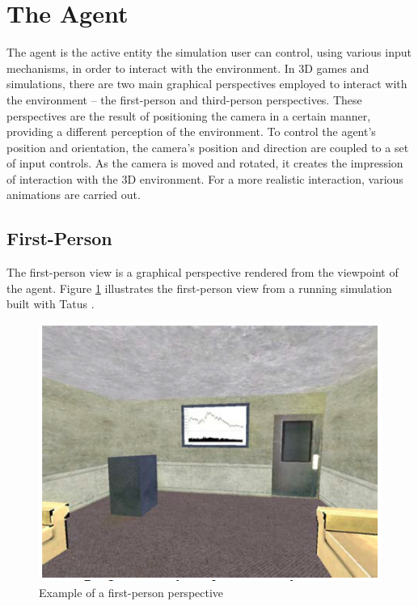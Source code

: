 \section{The Agent} %
\label{sec:the_agent}
The agent is the active entity the simulation user can control, using various input mechanisms, in order to interact with the environment. In 3D games and simulations, there are two main graphical perspectives employed to interact with the environment -- the first-person and third-person perspectives. These perspectives are the result of positioning the camera in a certain manner, providing a different perception of the environment. To control the agent's position and orientation, the camera's position and direction are coupled to a set of input controls. As the camera is moved and rotated, it creates the impression of interaction with the 3D environment. For a more realistic interaction, various animations are carried out.

\subsection{First-Person}\label{subsec:first_person}
The first-person view is a graphical perspective rendered from the viewpoint of the agent. Figure \ref{fig:fps} illustrates the first-person view from a running simulation built with Tatus \cite{o2005testbed}.

\begin{figure}[H]
	\centering
	\includegraphics[width=\linewidth]{gfx/Chapter3/fps}
	\caption{Example of a first-person perspective}
	\label{fig:fps}
\end{figure}

